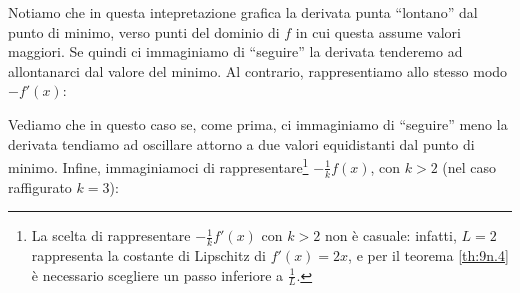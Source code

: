     Notiamo che in questa intepretazione grafica la derivata punta ``lontano'' dal punto di minimo, verso punti del dominio di $f$ in cui questa assume valori maggiori. Se quindi ci immaginiamo di ``seguire'' la derivata tenderemo ad allontanarci dal valore del minimo. Al contrario, rappresentiamo allo stesso modo $-f'(x)$:
    \begin{center}
    \end{center}
    Vediamo che in questo caso se, come prima, ci immaginiamo di ``seguire'' meno la derivata tendiamo ad oscillare attorno a due valori equidistanti dal punto di minimo. Infine, immaginiamoci di rappresentare\footnote{La scelta di rappresentare $-\frac{1}{k}f'(x)$ con $k>2$ non è casuale: infatti, $L=2$ rappresenta la costante di Lipschitz di $f'(x)=2x$, e per il teorema \ref{th:9n.4} è necessario scegliere un passo inferiore a $\frac{1}{L}$.} $-\frac{1}{k}f(x)$, con $k>2$ (nel caso raffigurato $k=3$):
    \begin{center}
    \end{center}
